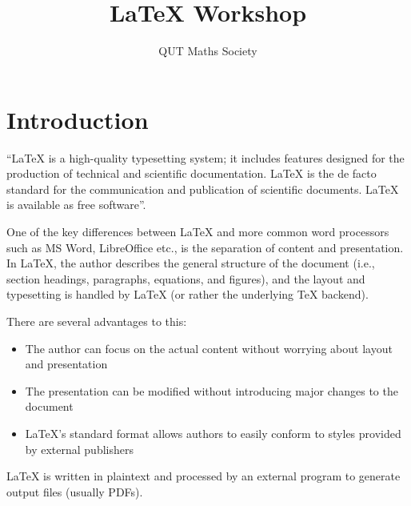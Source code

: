 \documentclass[11pt, twoside]{article}
\title{\LaTeX{} Workshop}
\author{QUT Maths Society}
\begin{document}

\maketitle


\tableofcontents

\listoffigures
\listoftables

\newpage
{}


\section{Introduction}
``\LaTeX{} is a high-quality typesetting system; it includes features designed for the production of technical and scientific documentation. \LaTeX{} is the de facto standard for the communication and publication of scientific documents. \LaTeX{} is available as free software''. \parencite{latex_project_latex_2018}

One of the key differences between \LaTeX{} and more common word processors such as MS Word, LibreOffice etc., is the separation of content and presentation. In \LaTeX{}, the author describes the general structure of the document (i.e., section headings, paragraphs, equations, and figures), and the layout and typesetting is handled by \LaTeX{} (or rather the underlying \TeX{} backend).

There are several advantages to this:
\begin{itemize}
    \item The author can focus on the actual content without worrying about layout and presentation
    \item The presentation can be modified without introducing major changes to the document
    \item \LaTeX{}'s standard format allows authors to easily conform to styles provided by external publishers
\end{itemize}
\LaTeX{} is written in plaintext and processed by an external program to generate output files (usually PDFs).
\end{document}
